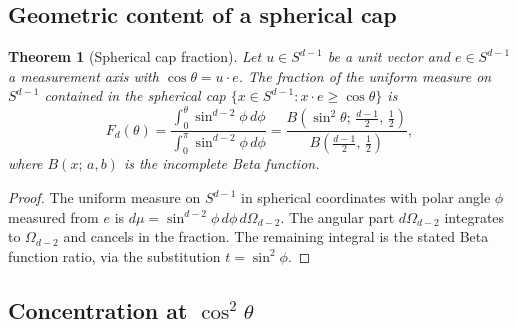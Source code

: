 \documentclass[12pt,a4paper]{article}
\newtheorem{theorem}{Theorem}[section]
\begin{document}
\subsection{Geometric content of a spherical cap}

\begin{theorem}[Spherical cap fraction]\label{thm:cap}
Let $u\in S^{d-1}$ be a unit vector and $e\in S^{d-1}$ a measurement axis with
$\cos\theta = u\cdot e$. The fraction of the uniform measure on $S^{d-1}$ contained in
the spherical cap $\{x\in S^{d-1} : x\cdot e \geq \cos\theta\}$ is
\begin{equation}\label{eq:cap}
F_d(\theta) = \frac{\int_0^{\theta}\sin^{d-2}\!\phi\,d\phi}
{\int_0^{\pi}\sin^{d-2}\!\phi\,d\phi}
= \frac{B(\sin^2\!\theta;\,\tfrac{d-1}{2},\,\tfrac{1}{2})}{B(\tfrac{d-1}{2},\,\tfrac{1}{2})},
\end{equation}
where $B(x;\,a,b)$ is the incomplete Beta function.
\end{theorem}
\begin{proof}
The uniform measure on $S^{d-1}$ in spherical coordinates with polar angle $\phi$ measured
from $e$ is $d\mu = \sin^{d-2}\!\phi\,d\phi\,d\Omega_{d-2}$. The angular part
$d\Omega_{d-2}$ integrates to $\Omega_{d-2}$ and cancels in the fraction. The remaining
integral is the stated Beta function ratio, via the substitution $t = \sin^2\!\phi$.
\end{proof}

\subsection{Concentration at \texorpdfstring{$\cos^2\theta$}{cos\^{}2 theta}}
\end{document}
